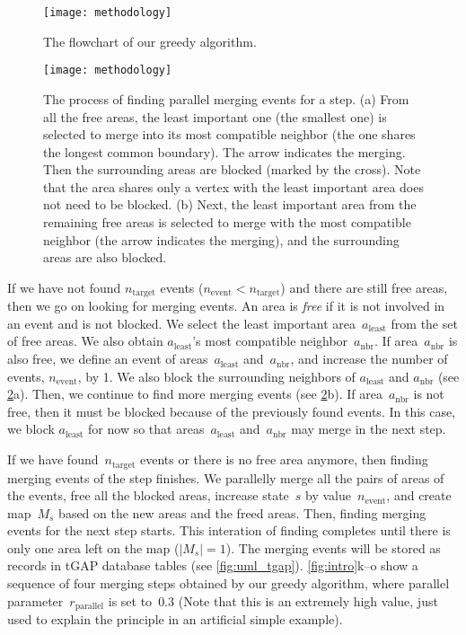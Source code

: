 \documentclass[ijgi,article,submit,moreauthors,pdftex]{Definitions/mdpi}
\begin{document}
\begin{figure}[tb]
\centering
\texttt{[image: methodology]}
\caption{The flowchart of our greedy algorithm.
}
\label{fig:greedy_framework}
\end{figure}


\begin{figure}[tb]
\centering
\texttt{[image: methodology]}
\caption{The process of finding parallel merging events for a step.
    (a) From all the free areas,
	the least important one (the smallest one) is selected to merge into
	its most compatible neighbor (the one shares the longest common boundary).
    The arrow indicates the merging.
	Then the surrounding areas are blocked (marked by the cross).
    Note that the area shares only a vertex with the least important area 
    does not need to be blocked.
	(b) Next, the least important area from the remaining free areas
	is selected to merge with the most compatible neighbor
	(the arrow indicates the merging),
	and the surrounding areas are also blocked.
}
\label{fig:blocked_polygons}
\end{figure}

If we have not found $n_\mathrm{target}$ events 
($n_\mathrm{event} < n_\mathrm{target}$)
and there are still free areas,
then we go on looking for merging events.
An area is \emph{free} if 
it is not involved in an event and is not blocked.
We select the least important area~$a_\mathrm{least}$
from the set of free areas.
We also obtain $a_\mathrm{least}$'s 
most compatible neighbor~$a_\mathrm{nbr}$.
If area~$a_\mathrm{nbr}$ is also free, 
we define an event of areas~$a_\mathrm{least}$ and~$a_\mathrm{nbr}$,
and increase the number of events, $n_\mathrm{event}$, by 1.
We also block the surrounding neighbors of $a_\mathrm{least}$ and $a_\mathrm{nbr}$
(see \fig\ref{fig:blocked_polygons}a).
Then, we continue to find more merging events
(see \fig\ref{fig:blocked_polygons}b).
If area~$a_\mathrm{nbr}$ is not free,
then it must be blocked because of the previously found events.
In this case, we block $a_\mathrm{least}$ for now
so that areas~$a_\mathrm{least}$ and~$a_\mathrm{nbr}$ 
may merge in the next step.

If we have found~$n_\mathrm{target}$ events 
or there is no free area anymore,
then finding merging events of the step finishes.
We parallelly merge all the pairs of areas of the events,
free all the blocked areas,
increase state~$s$ by value~$n_\mathrm{event}$,
and create map~$M_s$ based on the new areas and the freed areas.
Then, finding merging events for the next step starts.
This interation of finding completes 
until there is only one area left on the map ($|M_s|=1$).
The merging events will be stored as records in tGAP database tables
(see \fig\ref{fig:uml_tgap}).
\figs\ref{fig:intro}k--o show a sequence of four merging steps
obtained by our greedy algorithm,
where parallel parameter~$r_\mathrm{parallel}$ is set to~$0.3$
(Note that this is an extremely high value, 
just used to explain the principle in an artificial simple example).
\end{document}
